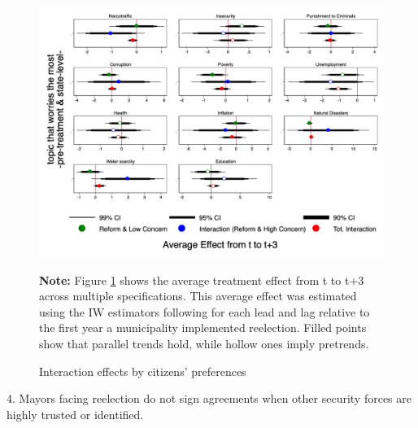 \documentclass[12pt]{amsart}
\numberwithin{equation}{section}
\theoremstyle{definition}
\theoremstyle{definition}
\theoremstyle{definition}
\begin{document}
\begin{figure}[H]   
\centering
 \caption{Interaction effects by citizens' preferences}
 \label{fig:preferences}
\includegraphics[width=1\textwidth]{../Figures/preferences.png}
       \captionsetup{justification=centering}
       
 \textbf{Note:} Figure \ref{fig:preferences} shows the average treatment effect from t to t+3 across multiple specifications. This average effect was estimated using the IW estimators following \citet{abraham_sun_2020} for each lead and lag relative to the first year a municipality implemented reelection. Filled points show that parallel trends hold, while hollow ones imply pretrends.  
\end{figure} 
  
  \clearpage

4. Mayors facing reelection do not sign agreements when other security forces are highly trusted or identified.
\end{document}
